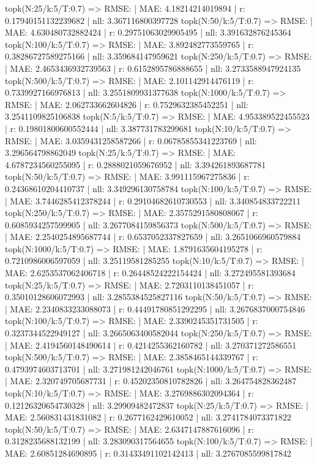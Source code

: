 topk(N:25/k:5/T:0.7) => RMSE: | MAE: 4.18214214019894 | r: 0.17940151132239682 | nll: 3.367116800397728
topk(N:50/k:5/T:0.7) => RMSE: | MAE: 4.630480732882424 | r: 0.29751063029905495 | nll: 3.391632876245364
topk(N:100/k:5/T:0.7) => RMSE: | MAE: 3.892482773559765 | r: 0.38286727589275166 | nll: 3.359684147959621
topk(N:250/k:5/T:0.7) => RMSE: | MAE: 2.4653436932739563 | r: 0.6152895786888655 | nll: 3.2733588947924135
topk(N:500/k:5/T:0.7) => RMSE: | MAE: 2.101142914476119 | r: 0.7339927166976813 | nll: 3.2551809931377638
topk(N:1000/k:5/T:0.7) => RMSE: | MAE: 2.062733662604826 | r: 0.7529632385452251 | nll: 3.2541109825106838
topk(N:5/k:5/T:0.7) => RMSE: | MAE: 4.953389522455523 | r: 0.19801800600552444 | nll: 3.387731783299681
topk(N:10/k:5/T:0.7) => RMSE: | MAE: 3.0359431258587266 | r: 0.06785855341223769 | nll: 3.296564798862049
topk(N:25/k:5/T:0.7) => RMSE: | MAE: 4.6787234560255095 | r: 0.2888021059676952 | nll: 3.394261893687781
topk(N:50/k:5/T:0.7) => RMSE: | MAE: 3.991115967275836 | r: 0.24368610204410737 | nll: 3.349296130758784
topk(N:100/k:5/T:0.7) => RMSE: | MAE: 3.7446285412378244 | r: 0.29104682610730553 | nll: 3.340854833722211
topk(N:250/k:5/T:0.7) => RMSE: | MAE: 2.3575291580808067 | r: 0.6085934257599905 | nll: 3.2677084159856373
topk(N:500/k:5/T:0.7) => RMSE: | MAE: 2.2540254895687744 | r: 0.6537052337827659 | nll: 3.2651066960579884
topk(N:1000/k:5/T:0.7) => RMSE: | MAE: 1.8791635604195278 | r: 0.7210986006597059 | nll: 3.25119581285255
topk(N:10/k:5/T:0.7) => RMSE: | MAE: 2.6253537062406718 | r: 0.26448524222154424 | nll: 3.272495581393684
topk(N:25/k:5/T:0.7) => RMSE: | MAE: 2.7203110138451057 | r: 0.35010128606072993 | nll: 3.2855384525827116
topk(N:50/k:5/T:0.7) => RMSE: | MAE: 2.2340833233088073 | r: 0.44491780851292295 | nll: 3.2676837000754846
topk(N:100/k:5/T:0.7) => RMSE: | MAE: 2.3390245351731505 | r: 0.3237344522949127 | nll: 3.2665063400582044
topk(N:250/k:5/T:0.7) => RMSE: | MAE: 2.4194560148490614 | r: 0.4214255362160782 | nll: 3.270371272586551
topk(N:500/k:5/T:0.7) => RMSE: | MAE: 2.3858465144339767 | r: 0.4793974603713701 | nll: 3.271981242046761
topk(N:1000/k:5/T:0.7) => RMSE: | MAE: 2.320749705687731 | r: 0.45202350810782826 | nll: 3.264754828362487
topk(N:10/k:5/T:0.7) => RMSE: | MAE: 3.2769886302094364 | r: 0.12126320654730328 | nll: 3.29909482472837
topk(N:25/k:5/T:0.7) => RMSE: | MAE: 2.560831431831082 | r: 0.2677162429610052 | nll: 3.2741784073371822
topk(N:50/k:5/T:0.7) => RMSE: | MAE: 2.6347147887616096 | r: 0.3128235688132199 | nll: 3.283090317564655
topk(N:100/k:5/T:0.7) => RMSE: | MAE: 2.60851284690895 | r: 0.31433491102142413 | nll: 3.2767085599817842
